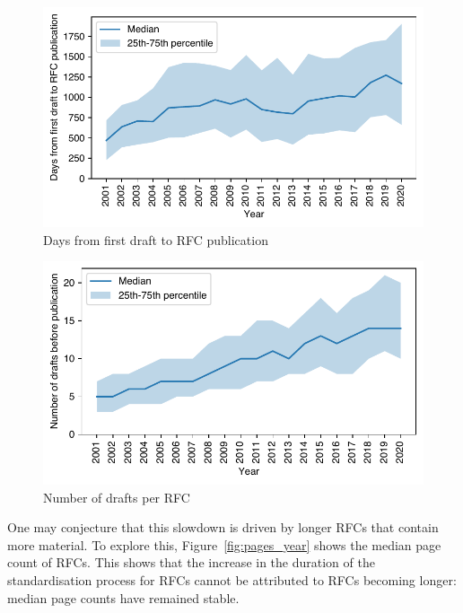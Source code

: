 \documentclass[twocolumn,10pt]{article}
\newlength{\figureWidthOneColumn}
\newcommand{\pb}[1]{\vspace{0.75ex}\noindent{\textbf{#1}}}
\begin{document}
\begin{figure}
  \centering
  \includegraphics[width=\figureWidthOneColumn]{figures-prev/imc-2021/documents/day_counts_yearly.pdf}
  \caption{
    Days from first draft to RFC publication
  }
  \label{fig:rfcs_days_to_pub}
\end{figure}

\begin{figure}
  \centering
  \includegraphics[width=\figureWidthOneColumn]{figures-prev/imc-2021/documents/draft_counts_yearly.pdf}
  \caption{
    Number of drafts per RFC
  }
  \label{fig:drafts_year}
\end{figure}

\pb{RFC Length:}
One may conjecture that this slowdown is driven by longer RFCs that contain
more material. To explore this, Figure~\ref{fig:pages_year} shows the
median page count of RFCs. This shows that the increase in the duration of
the standardisation process for RFCs cannot be attributed to RFCs becoming
longer: median page counts have remained stable. 
\end{document}
